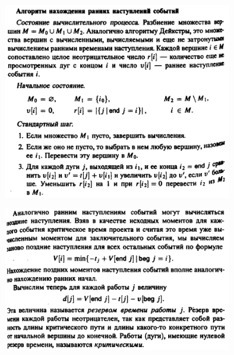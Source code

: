 \documentclass[discrete.tex]{subfiles}
\begin{document}
  \begin{figure}[H]
          \includegraphics[width=10cm]{pics/48_7}
          \centering
  \end{figure}

  \begin{figure}[H]
          \includegraphics[width=10cm]{pics/48_8}
          \centering
  \end{figure}
\end{document}
